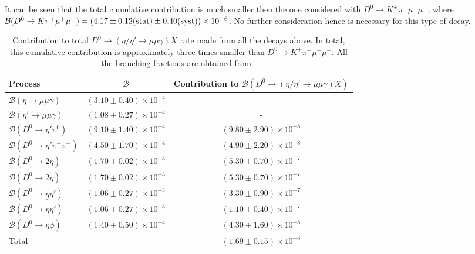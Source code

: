 It can be seen that the total cumulative contribution is much smaller then the one considered with $D^{0}\rightarrow K^{+} \pi^{-} \mu^{+} \mu^{-}$, where $\mathcal{B}(D^0 \rightarrow K \pi^+ \mu^{+} \mu^{-}) = (4.17\pm0.12 \rm{(stat)}\pm 0.40 \rm{(syst)})\times 10^{-6}$\cite{Aaij:2015hva}. No further consideration hence is necessary for this type of decay.

\begin{table}[ht]
\begin{center}
\begin{tabular}{ l  c  c }

\toprule
	Process & $\mathcal{B}$ & Contribution to $\mathcal{B}(D^{0} \rightarrow (\eta / \eta'\rightarrow \mu \mu \gamma) X)$ \\
\hline

$\mathcal{B}(\eta \rightarrow \mu \mu \gamma)$ & $(3.10\pm0.40)\times 10 ^{-4 }$ & -  \\
$\mathcal{B}(\eta' \rightarrow \mu \mu \gamma)$ & $(1.08\pm0.27)\times 10 ^{-4 }$ & -  \\
\hline
$\mathcal{B}(D^{0} \rightarrow \eta' \pi^{0})$ & $(9.10\pm1.40)\times 10 ^{-4 }$ & $(9.80\pm2.90)\times 10 ^{-8 }$ \\
$\mathcal{B}(D^{0} \rightarrow \eta' \pi^{+} \pi^{-})$ & $(4.50\pm1.70)\times 10 ^{-4 }$ & $(4.90\pm2.20)\times 10 ^{-8 }$ \\
$\mathcal{B}(D^{0} \rightarrow 2\eta )$ & $(1.70\pm0.02)\times 10 ^{-3 }$ & $(5.30\pm0.70)\times 10 ^{-7 }$ \\
$\mathcal{B}(D^{0} \rightarrow 2\eta )$ & $(1.70\pm0.02)\times 10 ^{-3 }$ & $(5.30\pm0.70)\times 10 ^{-7 }$ \\
$\mathcal{B}(D^{0} \rightarrow \underline{\eta} \eta' )$ & $(1.06\pm0.27)\times 10 ^{-3 }$ & $(3.30\pm0.90)\times 10 ^{-7 }$ \\
$\mathcal{B}(D^{0} \rightarrow \eta \underline{\eta}' )$ & $(1.06\pm0.27)\times 10 ^{-3 }$ & $(1.10\pm0.40)\times 10 ^{-7 }$ \\
$\mathcal{B}(D^{0} \rightarrow \eta \phi)$ & $(1.40\pm0.50)\times 10 ^{-4 }$ & $(4.30\pm1.60)\times 10 ^{-8 }$ \\
\hline
Total &  - &$(1.69\pm0.15)\times 10 ^{-6 }$ \\
\bottomrule
\end{tabular}
\end{center}
\caption{Contribution to total $D^{0} \rightarrow (\eta / \eta'\rightarrow \mu \mu \gamma) X$ rate made from all the \DIFdelbeginFL {}\DIFdelendFL decays \DIFaddbeginFL {}\DIFaddendFL above. In total, this cumulative contribution is approximately three times smaller than $D^{0}\rightarrow K^{+} \pi^{-} \mu^{+} \mu^{-}$. All the branching fractions are obtained from \cite{Patrignani:2016xqp}.}
\label{tab:etacont}
\end{table}

